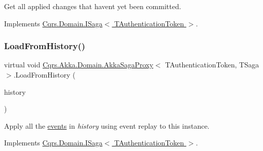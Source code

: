 Get all applied changes that haven\textquotesingle{}t yet been committed. 



Implements \hyperlink{interfaceCqrs_1_1Domain_1_1ISaga_abb77811b4f7d19adb61f9d33da18e7e0_abb77811b4f7d19adb61f9d33da18e7e0}{Cqrs.\+Domain.\+I\+Saga$<$ T\+Authentication\+Token $>$}.

\mbox{\label{classCqrs_1_1Akka_1_1Domain_1_1AkkaSagaProxy_a21b69799b046c1fcdf5b2443699dee0c_a21b69799b046c1fcdf5b2443699dee0c}} 
\subsubsection{\texorpdfstring{Load\+From\+History()}{LoadFromHistory()}}
{\footnotesize\ttfamily virtual void \hyperlink{classCqrs_1_1Akka_1_1Domain_1_1AkkaSagaProxy}{Cqrs.\+Akka.\+Domain.\+Akka\+Saga\+Proxy}$<$ T\+Authentication\+Token, T\+Saga $>$.Load\+From\+History (\begin{DoxyParamCaption}\item[{I\+Enumerable$<$ \hyperlink{interfaceCqrs_1_1Events_1_1ISagaEvent}{I\+Saga\+Event}$<$ T\+Authentication\+Token $>$$>$}]{history }\end{DoxyParamCaption})\hspace{0.3cm}{\ttfamily [virtual]}}



Apply all the \hyperlink{}{events} in {\itshape history}  using event replay to this instance. 



Implements \hyperlink{interfaceCqrs_1_1Domain_1_1ISaga_a2714804684bc65cf4dec79b4697b9b21_a2714804684bc65cf4dec79b4697b9b21}{Cqrs.\+Domain.\+I\+Saga$<$ T\+Authentication\+Token $>$}.

\mbox{\label{classCqrs_1_1Akka_1_1Domain_1_1AkkaSagaProxy_a5a5c012bc0f7f957b8bd2298956ca9ae_a5a5c012bc0f7f957b8bd2298956ca9ae}} 
